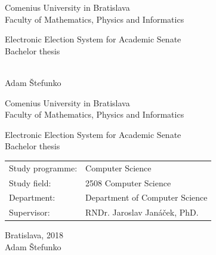 \documentclass[12pt, oneside]{book}
\def\mfrok{2018}
\def\mfnazov{Electronic Election System for Academic Senate}
\def\mftyp{Bachelor thesis}
\def\mfautor{Adam Štefunko}
\def\mfskolitel{RNDr. Jaroslav Janáček, PhD. }
\def\mfkonzultant{tit. Meno Priezvisko, tit. }
\def\mfmiesto{Bratislava, \mfrok}
\def\mfodbor{ 2508 Computer Science }
\def\program{ Computer Science }
\def\mfpracovisko{ Department of Computer Science }
\begin{document}
     
\frontmatter


\thispagestyle{empty}

\begin{center}
\sc\large
Comenius University in Bratislava\\
Faculty of Mathematics, Physics and Informatics

\vfill

{\LARGE\mfnazov}\\
\mftyp
\end{center}

\vfill

{\sc\large 
\noindent \mfrok\\
\mfautor
}

\eject %


\thispagestyle{empty}
\noindent

\begin{center}
\sc  
\large
Comenius University in Bratislava\\
Faculty of Mathematics, Physics and Informatics

\vfill

{\LARGE\mfnazov}\\
\mftyp
\end{center}

\vfill

\noindent
\begin{tabular}{ll}
Study programme: & \program \\
Study field: & \mfodbor \\
Department: & \mfpracovisko \\
Supervisor: & \mfskolitel \\
\end{tabular}

\vfill


\noindent \mfmiesto\\
\mfautor

\eject %


\end{document}
